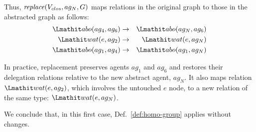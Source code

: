
%
Thus, $\mathit{replace}(V_{clos}, ag_N, G)$ maps relations in the original graph to those in the abstracted graph as follows:
%
\begin{eqnarray*}
\delegate(ag_4, ag_6) & \rightarrow &  \delegate(ag_N, ag_6) \\
\wat(e, ag_2) & \rightarrow &  \wat(e, ag_N) \\
\delegate(ag_1, ag_4) & \rightarrow &   \delegate(ag_1, ag_N)
\end{eqnarray*}

In practice, replacement preserves agents $ag_1$ and $ag_6$ and restores their delegation relations relative to the new abstract agent, $ag_N$. It also maps relation $\wat(e,ag_2)$, which involves the untouched $e$ node, to a new relation of the same type: $\wat(e,ag_N)$. 

We conclude that, in this first case, Def.~\ref{def:homo-group} applies without changes.

%

